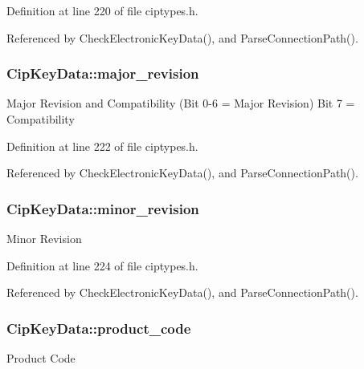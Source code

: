 \-Definition at line 220 of file ciptypes.\-h.



\-Referenced by \-Check\-Electronic\-Key\-Data(), and \-Parse\-Connection\-Path().

\hypertarget{structCipKeyData_a5a27977908b8620e0415af0df2b04b0f}{
\subsubsection[{major\-\_\-revision}]{ {\bf \-Cip\-Key\-Data\-::major\-\_\-revision}}}\label{df/d55/structCipKeyData_a5a27977908b8620e0415af0df2b04b0f}
\-Major \-Revision and \-Compatibility (\-Bit 0-\/6 = \-Major \-Revision) \-Bit 7 = \-Compatibility 

\-Definition at line 222 of file ciptypes.\-h.



\-Referenced by \-Check\-Electronic\-Key\-Data(), and \-Parse\-Connection\-Path().

\hypertarget{structCipKeyData_a68f494d5f2eb613aa99c1bbd6fd1900b}{
\subsubsection[{minor\-\_\-revision}]{ {\bf \-Cip\-Key\-Data\-::minor\-\_\-revision}}}\label{df/d55/structCipKeyData_a68f494d5f2eb613aa99c1bbd6fd1900b}
\-Minor \-Revision 

\-Definition at line 224 of file ciptypes.\-h.



\-Referenced by \-Check\-Electronic\-Key\-Data(), and \-Parse\-Connection\-Path().

\hypertarget{structCipKeyData_a0a5beaf0d16ae75c719db6ada40c721b}{
\subsubsection[{product\-\_\-code}]{ {\bf \-Cip\-Key\-Data\-::product\-\_\-code}}}\label{df/d55/structCipKeyData_a0a5beaf0d16ae75c719db6ada40c721b}
\-Product \-Code 

